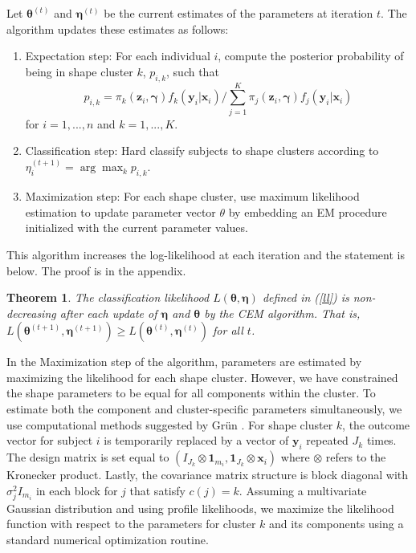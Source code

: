 \documentclass[12pt]{article}
\newtheorem{theorem}{Theorem}
\newcommand{\B}[0]{\mathbf}
\newcommand{\bs}[0]{\boldsymbol}
\begin{document}
Let $\bs\theta^{(t)}$ and $\bs\eta^{(t)}$ be the current estimates of the parameters at iteration $t$. The algorithm updates these estimates as follows:
\begin{enumerate}
\item Expectation step: For each individual $i$, compute the posterior probability of being in shape cluster $k$, $p_{i,k}$, such that
$$p_{i,k}= \pi_{k}(\B z_{i},\bs\gamma)f_{k}(\B y_{i}|\B x_{i})/\sum^{K}_{j=1} \pi_{j}(\B z_{i},\bs\gamma)f_{j}(\B y_{i}|\B x_{i})$$
for $i=1,...,n$ and $k=1,...,K$.
\item Classification step: Hard classify subjects to shape clusters according to $\eta^{(t+1)}_{i} = \arg\max_{k} p_{i,k}$.
\item Maximization step: For each shape cluster, use maximum likelihood estimation to update parameter vector $\theta$ by embedding an EM procedure initialized with the current parameter values.
\end{enumerate} 
This algorithm increases the log-likelihood at each iteration and the statement is below. The proof is in the appendix. 
\begin{theorem} The classification likelihood $L(\bs\theta,\bs\eta)$ defined in (\ref{ll}) is non-decreasing after each update of $\bs\eta$ and $\bs\theta$ by the CEM algorithm. That is, $L(\bs\theta^{(t+1)},\bs\eta^{(t+1)}) \geq L(\bs\theta^{(t)},\bs\eta^{(t)})$ for all $t$.
\end{theorem}

In the Maximization step of the algorithm, parameters are estimated by maximizing the likelihood for each shape cluster. However, we have constrained the shape parameters to be equal for all components within the cluster. To estimate both the component and cluster-specific parameters simultaneously, we use computational methods suggested by Gr{\"u}n \cite{grun2008}. For shape cluster $k$, the outcome vector for subject $i$ is temporarily replaced by a vector of $\B y_{i}$ repeated $J_{k}$ times. The design matrix  is set equal to $(I_{J_{k}}\otimes \bs 1_{m_{i}}, \bs 1_{J_{k}} \otimes \B x_{i})$ where $\otimes$ refers to the Kronecker product. Lastly, the covariance matrix structure is block diagonal with $\sigma^{2}_{j}I_{m_{i}}$ in each block for $j$ that satisfy $c(j)=k$. Assuming a multivariate Gaussian distribution and using profile likelihoods, we maximize the likelihood function with respect to the parameters for cluster $k$ and its components using a standard numerical optimization routine.\\
\end{document}
